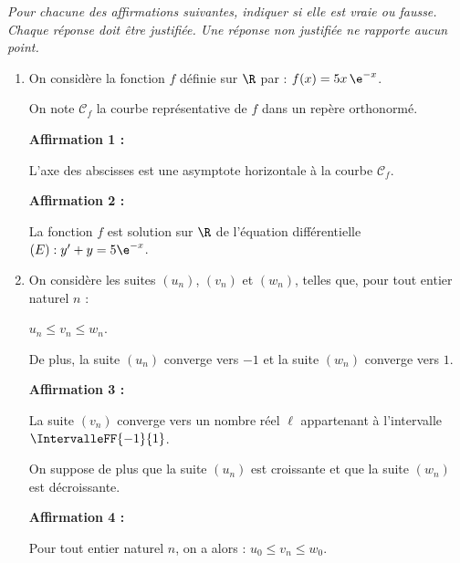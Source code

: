 \textit{Pour chacune des affirmations suivantes, indiquer si elle est vraie ou fausse. Chaque réponse doit être justifiée. Une réponse non justifiée ne rapporte aucun point.}

\begin{enumerate}
	\item On considère la fonction $f$ définie sur $\R$ par : $f(x)=5x\,\e^{-x}$.
	
	On note $\mathcal{C}_{f}$ la courbe représentative de $f$ dans un repère orthonormé.
	
	\medskip
	
	\textbf{Affirmation 1 :}
	
	L'axe des abscisses est une asymptote horizontale à la courbe $\mathcal{C}_{f}$.
	
	\medskip
	
	\textbf{Affirmation 2 :}
	
	La fonction $f$ est solution sur $\R$ de l'équation différentielle $(E): y^{\prime}+y=5 \e^{-x}$.
	\item On considère les suites $\left(u_{n}\right)$, $\left(v_{n}\right)$ et $\left(w_{n}\right)$, telles que, pour tout entier naturel $n$ :
	\begin{Centrage}
		$u_{n} \leqslant v_{n} \leqslant w_{n}$.
	\end{Centrage}
	
	De plus, la suite $\left(u_{n}\right)$ converge vers $-1$ et la suite $\left(w_{n}\right)$ converge vers $1$.
	
	\medskip
	
	\textbf{Affirmation 3 :}
	
	La suite $\left(v_{n}\right)$ converge vers un nombre réel $\ell$ appartenant à l'intervalle $\IntervalleFF{-1}{1}$.
	
	On suppose de plus que la suite $\left(u_{n}\right)$ est croissante et que la suite $\left(w_{n}\right)$ est décroissante.
	
	\smallskip
	
	\textbf{Affirmation 4 :}
	
	Pour tout entier naturel $n$, on a alors : $u_{0} \leqslant v_{n} \leqslant w_{0}$.
\end{enumerate}